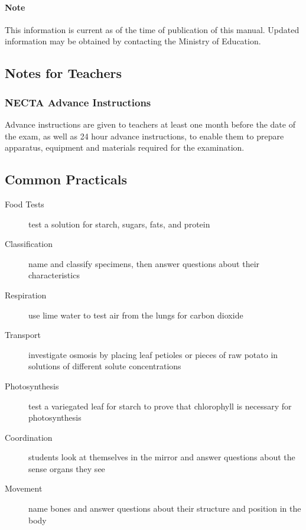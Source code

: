 \paragraph{Note} This information is current as of the time of publication of this manual. Updated information may be obtained by contacting the Ministry of Education. 

\subsection{Notes for Teachers}

\subsubsection{NECTA Advance Instructions}
Advance instructions are given to teachers at least one month before the date of the exam, as well as 24 hour advance instructions, to enable them to prepare apparatus, equipment and materials required for the examination.




\subsection{Common Practicals}
\begin{description}
\item[Food Tests]{test a solution for starch, sugars, fats, and protein}
\item[Classification]{name and classify specimens, then answer questions about their characteristics}
\item[Respiration]{use lime water to test air from the lungs for carbon dioxide}
\item[Transport]{investigate osmosis by placing leaf petioles or pieces of raw potato in solutions of different solute concentrations}
\item[Photosynthesis]{test a variegated leaf for starch to prove that chlorophyll is necessary for photosynthesis}
\item[Coordination]{students look at themselves in the mirror and answer questions about the sense organs they see}
\item[Movement]{name bones and answer questions about their structure and position in the body}
\end{description}

